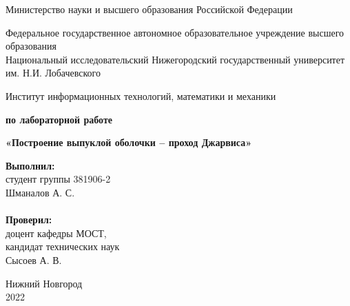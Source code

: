 \documentclass{report}
\begin{document}
\begin{titlepage}

\begin{center}
Министерство науки и высшего образования Российской Федерации
\end{center}

\begin{center}
Федеральное государственное автономное образовательное учреждение высшего образования \\
Национальный исследовательский Нижегородский государственный университет им. Н.И. Лобачевского
\end{center}

\begin{center}
Институт информационных технологий, математики и механики
\end{center}

\vspace{4em}

\begin{center}
\textbf{ по лабораторной работе} \\
\end{center}
\begin{center}
\textbf{\Large«Построение выпуклой оболочки – проход Джарвиса»} \\
\end{center}

\vspace{4em}

\newbox{\lbox}
\newlength{\maxl}
\setlength{\maxl}{\wd\lbox}
\hfill\parbox{7cm}{
\hspace*{5cm}\hspace*{-5cm}\textbf{Выполнил:} \\ студент группы 381906-2 \\ Шманалов А. С.\\
\\
\hspace*{5cm}\hspace*{-5cm}\textbf{Проверил:}\\ доцент кафедры МОСТ, \\ кандидат технических наук \\ Сысоев А. В.\\
}
\vspace{\fill}

\begin{center} Нижний Новгород \\ 2022 \end{center}

\end{titlepage}
\end{document}
